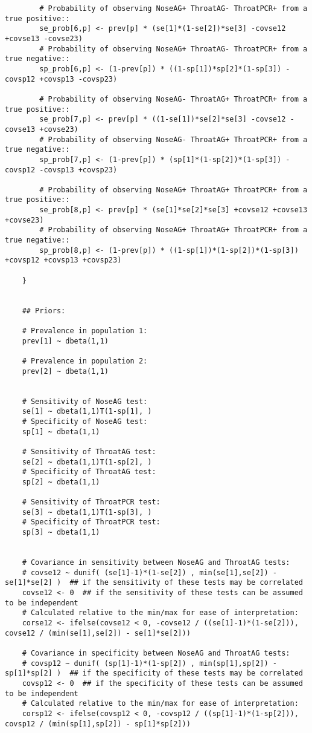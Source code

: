 \documentclass[
  ignorenonframetext,
  aspectratio=169,
]{beamer}
\begin{document}
\begin{frame}[fragile]
\begin{verbatim}
        # Probability of observing NoseAG+ ThroatAG- ThroatPCR+ from a true positive::
        se_prob[6,p] <- prev[p] * (se[1]*(1-se[2])*se[3] -covse12 +covse13 -covse23)
        # Probability of observing NoseAG+ ThroatAG- ThroatPCR+ from a true negative::
        sp_prob[6,p] <- (1-prev[p]) * ((1-sp[1])*sp[2]*(1-sp[3]) -covsp12 +covsp13 -covsp23)

        # Probability of observing NoseAG- ThroatAG+ ThroatPCR+ from a true positive::
        se_prob[7,p] <- prev[p] * ((1-se[1])*se[2]*se[3] -covse12 -covse13 +covse23)
        # Probability of observing NoseAG- ThroatAG+ ThroatPCR+ from a true negative::
        sp_prob[7,p] <- (1-prev[p]) * (sp[1]*(1-sp[2])*(1-sp[3]) -covsp12 -covsp13 +covsp23)

        # Probability of observing NoseAG+ ThroatAG+ ThroatPCR+ from a true positive::
        se_prob[8,p] <- prev[p] * (se[1]*se[2]*se[3] +covse12 +covse13 +covse23)
        # Probability of observing NoseAG+ ThroatAG+ ThroatPCR+ from a true negative::
        sp_prob[8,p] <- (1-prev[p]) * ((1-sp[1])*(1-sp[2])*(1-sp[3]) +covsp12 +covsp13 +covsp23)

    }


    ## Priors:

    # Prevalence in population 1:
    prev[1] ~ dbeta(1,1)

    # Prevalence in population 2:
    prev[2] ~ dbeta(1,1)


    # Sensitivity of NoseAG test:
    se[1] ~ dbeta(1,1)T(1-sp[1], )
    # Specificity of NoseAG test:
    sp[1] ~ dbeta(1,1)

    # Sensitivity of ThroatAG test:
    se[2] ~ dbeta(1,1)T(1-sp[2], )
    # Specificity of ThroatAG test:
    sp[2] ~ dbeta(1,1)

    # Sensitivity of ThroatPCR test:
    se[3] ~ dbeta(1,1)T(1-sp[3], )
    # Specificity of ThroatPCR test:
    sp[3] ~ dbeta(1,1)


    # Covariance in sensitivity between NoseAG and ThroatAG tests:
    # covse12 ~ dunif( (se[1]-1)*(1-se[2]) , min(se[1],se[2]) - se[1]*se[2] )  ## if the sensitivity of these tests may be correlated
    covse12 <- 0  ## if the sensitivity of these tests can be assumed to be independent
    # Calculated relative to the min/max for ease of interpretation:
    corse12 <- ifelse(covse12 < 0, -covse12 / ((se[1]-1)*(1-se[2])), covse12 / (min(se[1],se[2]) - se[1]*se[2]))

    # Covariance in specificity between NoseAG and ThroatAG tests:
    # covsp12 ~ dunif( (sp[1]-1)*(1-sp[2]) , min(sp[1],sp[2]) - sp[1]*sp[2] )  ## if the specificity of these tests may be correlated
    covsp12 <- 0  ## if the specificity of these tests can be assumed to be independent
    # Calculated relative to the min/max for ease of interpretation:
    corsp12 <- ifelse(covsp12 < 0, -covsp12 / ((sp[1]-1)*(1-sp[2])), covsp12 / (min(sp[1],sp[2]) - sp[1]*sp[2]))


\end{verbatim}
\end{frame}
\end{document}
